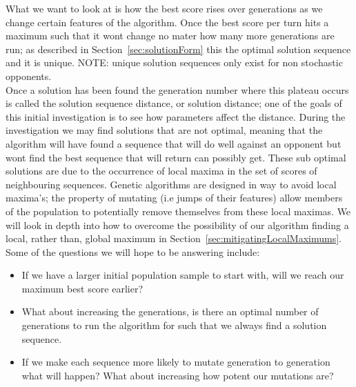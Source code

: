 What we want to look at is how the best score rises over generations as we change certain features of the algorithm.
Once the best score per turn hits a maximum such that it wont change no mater how many more generations are run;
as described in Section~\ref{sec:solutionForm} this the optimal solution sequence and it is unique.
NOTE: unique solution sequences only exist for non stochastic opponents.\\

Once a solution has been found the generation number where this plateau occurs is called the solution sequence distance, or solution distance;
one of the goals of this initial investigation is to see how parameters affect the distance.
During the investigation we may find solutions that are not optimal, meaning that the algorithm will have found a sequence that will do well against an opponent but wont find the best sequence that will return can possibly get.
These sub optimal solutions are due to the occurrence of local maxima in the set of scores of neighbouring sequences.
Genetic algorithms are designed in way to avoid local maxima's;
the property of mutating (i.e jumps of their features) allow members of the population to potentially remove themselves from these local maximas.
We will look in depth into how to overcome the possibility of our algorithm finding a local, rather than, global maximum in Section~\ref{sec:mitigatingLocalMaximums}.
Some of the questions we will hope to be answering include:
\begin{itemize}
    \item If we have a larger initial population sample to start with, will we reach our maximum best score earlier?
    \item What about increasing the generations, is there an optimal number of generations to run the algorithm for such that we always find a solution sequence.
    \item If we make each sequence more likely to mutate generation to generation what will happen?
    What about increasing how potent our mutations are?
\end{itemize}

